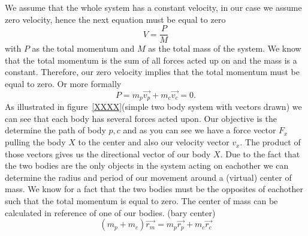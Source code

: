 \documentclass[11pt]{article} %
\begin{document}
We assume that the whole system has a constant velocity, in our case we assume zero velocity, hence the next equation must be equal to zero
\begin{equation}
	V = \frac{P}{M}	
\end{equation}
with $P$ as the total momentum and $M$ as the total mass of the system. We know that the total momentum is the sum of all forces acted up on and the mass is a constant. Therefore, our zero velocity implies that the total momentum must be equal to zero. Or more formally
\begin{equation}
	P = m_p\overrightarrow{v_p} + m_c\overrightarrow{v_c} = 0.
\end{equation}
As illustrated in figure~\ref{XXXX}(simple two body system with vectors drawn) we can see that each body has several forces acted upon. Our objective is the determine the path of body $p,c$ and as you can see we have a force vector $F_x$ pulling the body $X$ to the center and also our velocity vector $v_x$. The product of those vectors gives us the directional vector of our body $X$. Due to the fact that the two bodies are the only objects in the system acting on eachother we can determine the radius and period of our movement around a (virtual) center of mass. We know for a fact that the two bodies must be the opposites of eachother such that the total momentum is equal to zero. The center of mass can be calculated in reference of one of our bodies.  (bary center)
\begin{equation}
	(m_p + m_c)\overrightarrow{r_{m}} = m_p\overrightarrow{r_p} + m_c\overrightarrow{r_c} 
\end{equation}
\end{document}
